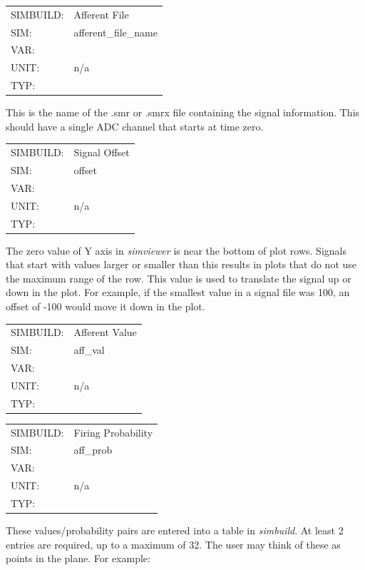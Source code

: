 \documentclass[12pt,openany,oneside]{book}
\newcommand{\prog}[1]{\textit{{#1}}}
\begin{document}
\begin{flushleft}
\begin{tabular}{@{}ll@{}}
SIMBUILD: & Afferent File\\
SIM: & afferent\_file\_name\\
VAR: &\\
UNIT: & n/a\\
TYP: &\\
\end{tabular}
\end{flushleft}
This is the name of the .smr or .smrx file containing the signal
information. This should have a single ADC channel that starts at time
zero.


\begin{flushleft}
\begin{tabular}{@{}ll@{}}
SIMBUILD: & Signal Offset\\
SIM: & offset\\
VAR: &\\
UNIT: & n/a\\
TYP: &\\
\end{tabular}
\end{flushleft}
The zero value of Y axis in \prog{simviewer} is near the bottom of plot
rows. Signals that start with values larger or smaller than this
results in plots that do not use the maximum range of the row. This value
is used to translate the signal up or down in the plot. For example, if
the smallest value in a signal file was 100, an offset of -100 would move
it down in the plot.


\begin{flushleft}
\begin{tabular}{@{}ll@{}}
SIMBUILD: & Afferent Value\\
SIM: & aff\_val\\
VAR: &\\
UNIT: & n/a\\
TYP: &\\
\end{tabular}
\end{flushleft}

\begin{flushleft}
\begin{tabular}{@{}ll@{}}
SIMBUILD: & Firing Probability\\
SIM: & aff\_prob\\
VAR: &\\
UNIT: & n/a\\
TYP: &\\
\end{tabular}
\end{flushleft}
These values/probability pairs are entered into a table 
in \prog{simbuild}. At least 2
entries are required, up to a maximum of 32. The user may think of these
as points in the plane. For example:
\end{document}
